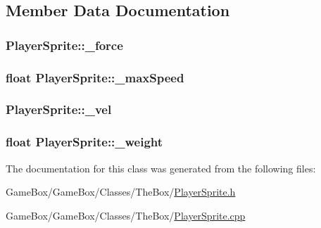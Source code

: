 \subsection{\-Member \-Data \-Documentation}
\hypertarget{class_player_sprite_a757b1bae929885dad7d92c53bcd2e9b1}{
\subsubsection[{\-\_\-force}]{ {\bf \-Player\-Sprite\-::\-\_\-force}}}\label{class_player_sprite_a757b1bae929885dad7d92c53bcd2e9b1}
\hypertarget{class_player_sprite_a5b5a402a9273c0367e51f6e47256d4f3}{
\subsubsection[{\-\_\-max\-Speed}]{\setlength{\rightskip}{0pt plus 5cm}float {\bf \-Player\-Sprite\-::\-\_\-max\-Speed}}}\label{class_player_sprite_a5b5a402a9273c0367e51f6e47256d4f3}
\hypertarget{class_player_sprite_afe7c3cf489f98746ee798ea4e6d18f0d}{
\subsubsection[{\-\_\-vel}]{ {\bf \-Player\-Sprite\-::\-\_\-vel}}}\label{class_player_sprite_afe7c3cf489f98746ee798ea4e6d18f0d}
\hypertarget{class_player_sprite_ae2d7c734bea5fd1f590ac33854a2ceed}{
\subsubsection[{\-\_\-weight}]{\setlength{\rightskip}{0pt plus 5cm}float {\bf \-Player\-Sprite\-::\-\_\-weight}}}\label{class_player_sprite_ae2d7c734bea5fd1f590ac33854a2ceed}


\-The documentation for this class was generated from the following files\-:\begin{DoxyCompactItemize}
\item 
\-Game\-Box/\-Game\-Box/\-Classes/\-The\-Box/\hyperlink{_player_sprite_8h}{\-Player\-Sprite.\-h}\item 
\-Game\-Box/\-Game\-Box/\-Classes/\-The\-Box/\hyperlink{_player_sprite_8cpp}{\-Player\-Sprite.\-cpp}\end{DoxyCompactItemize}
